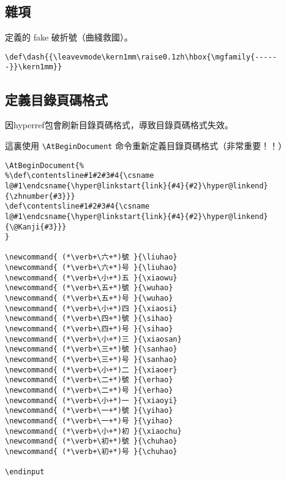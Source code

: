 \subsection{雜項}

\par 定義的 fake 破折號（曲綫救國）。
\begin{lstlisting}[firstnumber=1224]
\def\dash{{\leavevmode\kern1mm\raise0.1zh\hbox{\mgfamily{------}}\kern1mm}}
\end{lstlisting}



\subsection{定義目錄頁碼格式}
\par 因hyperref包會刷新目錄頁碼格式，導致目錄頁碼格式失效。
\par 這裏使用 \verb+\AtBeginDocument+ 命令重新定義目錄頁碼格式（非常重要！！）
\begin{lstlisting}[firstnumber=1227]
\AtBeginDocument{%
%\def\contentsline#1#2#3#4{\csname l@#1\endcsname{\hyper@linkstart{link}{#4}{#2}\hyper@linkend}{\zhnumber{#3}}}
\def\contentsline#1#2#3#4{\csname l@#1\endcsname{\hyper@linkstart{link}{#4}{#2}\hyper@linkend}{\@Kanji{#3}}}
}

\newcommand{ (*\verb+\六+*)號 }{\liuhao}
\newcommand{ (*\verb+\六+*)号 }{\liuhao}
\newcommand{ (*\verb+\小+*)五 }{\xiaowu}
\newcommand{ (*\verb+\五+*)號 }{\wuhao}
\newcommand{ (*\verb+\五+*)号 }{\wuhao}
\newcommand{ (*\verb+\小+*)四 }{\xiaosi}
\newcommand{ (*\verb+\四+*)號 }{\sihao}
\newcommand{ (*\verb+\四+*)号 }{\sihao}
\newcommand{ (*\verb+\小+*)三 }{\xiaosan}
\newcommand{ (*\verb+\三+*)號 }{\sanhao}
\newcommand{ (*\verb+\三+*)号 }{\sanhao}
\newcommand{ (*\verb+\小+*)二 }{\xiaoer}
\newcommand{ (*\verb+\二+*)號 }{\erhao}
\newcommand{ (*\verb+\二+*)号 }{\erhao}
\newcommand{ (*\verb+\小+*)一 }{\xiaoyi}
\newcommand{ (*\verb+\一+*)號 }{\yihao}
\newcommand{ (*\verb+\一+*)号 }{\yihao}
\newcommand{ (*\verb+\小+*)初 }{\xiaochu}
\newcommand{ (*\verb+\初+*)號 }{\chuhao}
\newcommand{ (*\verb+\初+*)号 }{\chuhao}

\endinput
\end{lstlisting}


\endinput